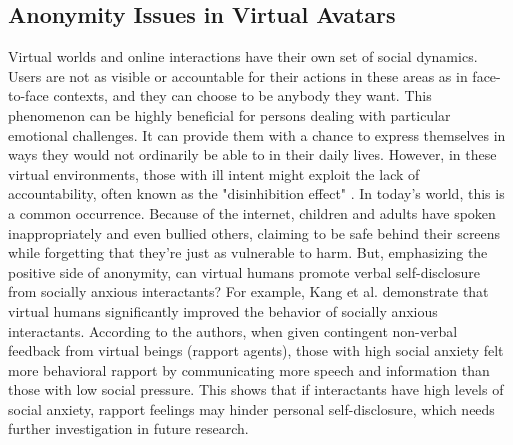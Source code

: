 \subsection{Anonymity Issues in Virtual Avatars}
Virtual worlds and online interactions have their own set of social dynamics. Users are not as visible or accountable for their actions in these areas as in face-to-face contexts, and they can choose to be anybody they want. This phenomenon can be highly beneficial for persons dealing with particular emotional challenges. It can provide them with a chance to express themselves in ways they would not ordinarily be able to in their daily lives. However, in these virtual environments, those with ill intent might exploit the lack of accountability, often known as the "disinhibition effect" \cite{WAN20, KUR18}. In today's world, this is a common occurrence. Because of the internet, children and adults have spoken inappropriately and even bullied others, claiming to be safe behind their screens while forgetting that they're just as vulnerable to harm. But, emphasizing the positive side of anonymity, can virtual humans promote verbal self-disclosure from socially anxious interactants? For example, Kang et al. \cite{KAN10} demonstrate that virtual humans significantly improved the behavior of socially anxious interactants. According to the authors, when given contingent non-verbal feedback from virtual beings (rapport agents), those with high social anxiety felt more behavioral rapport by communicating more speech and information than those with low social pressure. This shows that if interactants have high levels of social anxiety, rapport feelings may hinder personal self-disclosure, which needs further investigation in future research.

